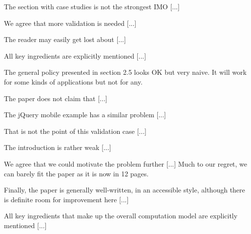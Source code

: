 \documentclass{article}
\begin{document}
\begin{remark}
  The section with case studies is not the strongest IMO [...]
\end{remark}
\begin{future}
  We agree that more validation is needed [...]
\end{future}

\begin{remark}
  The reader may easily get lost about [...]
\end{remark}
\begin{unspecific}
  All key ingredients are explicitly mentioned [...]
\end{unspecific}

\begin{remark}
  The general policy presented in section 2.5 looks OK but very naive.
  It will work for some kinds of applications but not for any.
\end{remark}
\begin{incorrect}
  The paper does not claim that [...]
\end{incorrect}

\begin{remark}
  The jQuery mobile example has a similar problem [...]
\end{remark}
\begin{disagree}
  That is not the point of this validation case [...]
\end{disagree}

\begin{remark}
  The introduction is rather weak [...]
\end{remark}
\begin{unsolved}
  We agree that we could motivate the problem further [...]  Much to
  our regret, we can barely fit the paper as it is now in 12 pages.
\end{unsolved}

\begin{remark}
  Finally, the paper is generally well-written, in an accessible
  style, although there is definite room for improvement here [...]
\end{remark}
\begin{unspecific}
  All key ingredients that make up the overall computation model are
  explicitly mentioned [...]
\end{unspecific}
\end{document}
